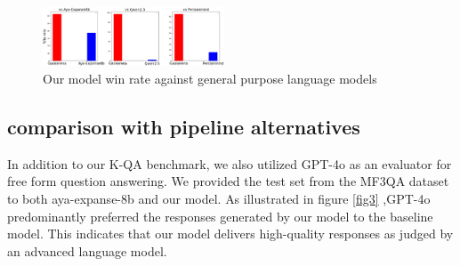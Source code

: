 \documentclass[conference]{IEEEtran}
\begin{document}
\begin{figure}[htbp]
	\centerline{\includegraphics[width=0.48\textwidth]{fig4.png}}
	\caption{Our model win rate against general purpose language models}
	\label{fig4}
\end{figure}
\subsection{comparison with pipeline alternatives}

In addition to our K-QA benchmark, we also utilized GPT-4o
\cite{b20}
as an evaluator for free form question answering. We provided the test set from the MF3QA dataset to both aya-expanse-8b and our model. As illustrated in figure
\ref{fig3}
,GPT-4o predominantly preferred the responses generated by our model to the baseline model. This indicates that our model delivers high-quality responses as judged by an advanced language model.
\end{document}
